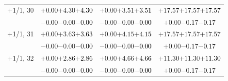 \documentclass[compress]{beamer}
\begin{document}
\begin{frame}
\begin{tabular}{r | c | c | c}
$+$1/1, 30 & $+0.00$\hspace{0.1 cm}$+4.30$\hspace{0.1 cm}\textcolor{black}{$+4.30$} & $+0.00$\hspace{0.1 cm}$+3.51$\hspace{0.1 cm}\textcolor{black}{$+3.51$} & $+17.57$\hspace{0.1 cm}$+17.57$\hspace{0.1 cm}\textcolor{black}{$+17.57$} \\
           & $-0.00$\hspace{0.1 cm}$-0.00$\hspace{0.1 cm}\textcolor{black}{$-0.00$} & $-0.00$\hspace{0.1 cm}$-0.00$\hspace{0.1 cm}\textcolor{black}{$-0.00$} & $+0.00$\hspace{0.1 cm}$-0.17$\hspace{0.1 cm}\textcolor{black}{$-0.17$} \\
$+$1/1, 31 & $+0.00$\hspace{0.1 cm}$+3.63$\hspace{0.1 cm}\textcolor{black}{$+3.63$} & $+0.00$\hspace{0.1 cm}$+4.15$\hspace{0.1 cm}\textcolor{black}{$+4.15$} & $+17.57$\hspace{0.1 cm}$+17.57$\hspace{0.1 cm}\textcolor{black}{$+17.57$} \\
           & $-0.00$\hspace{0.1 cm}$-0.00$\hspace{0.1 cm}\textcolor{black}{$-0.00$} & $-0.00$\hspace{0.1 cm}$-0.00$\hspace{0.1 cm}\textcolor{black}{$-0.00$} & $+0.00$\hspace{0.1 cm}$-0.17$\hspace{0.1 cm}\textcolor{black}{$-0.17$} \\
$+$1/1, 32 & $+0.00$\hspace{0.1 cm}$+2.86$\hspace{0.1 cm}\textcolor{black}{$+2.86$} & $+0.00$\hspace{0.1 cm}$+4.66$\hspace{0.1 cm}\textcolor{black}{$+4.66$} & $+11.30$\hspace{0.1 cm}$+11.30$\hspace{0.1 cm}\textcolor{black}{$+11.30$} \\
           & $-0.00$\hspace{0.1 cm}$-0.00$\hspace{0.1 cm}\textcolor{black}{$-0.00$} & $-0.00$\hspace{0.1 cm}$-0.00$\hspace{0.1 cm}\textcolor{black}{$-0.00$} & $+0.00$\hspace{0.1 cm}$-0.17$\hspace{0.1 cm}\textcolor{black}{$-0.17$} \\

\end{tabular}
\end{frame}
\end{document}
